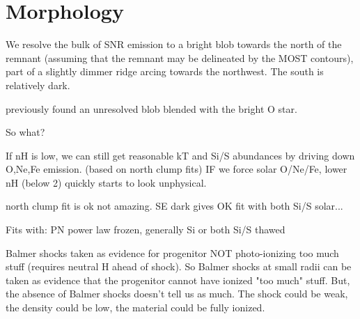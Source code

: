 \documentclass[preprint2,tighten,trackchanges]{aastex6}
\begin{document}
\section{Morphology}

We resolve the bulk of SNR emission to a bright blob towards the north of the
remnant (assuming that the remnant may be delineated by the MOST contours),
part of a slightly dimmer ridge arcing towards the northwest.
The south is relatively dark.

 previously found an unresolved blob blended with the bright O
star.

So what?



If nH is low, we can still get reasonable kT and Si/S abundances
by driving down O,Ne,Fe emission. (based on north clump fits)
IF we force solar O/Ne/Fe, lower nH (below 2) quickly starts to look
unphysical.

north clump fit is ok not amazing.
SE dark gives OK fit with both Si/S solar...

Fits with: PN power law frozen, generally Si or both Si/S thawed



Balmer shocks taken as evidence for progenitor NOT photo-ionizing too much
stuff (requires neutral H ahead of shock).  So Balmer shocks at small radii can
be taken as evidence that the progenitor cannot have ionized "too much" stuff.
But, the absence of Balmer shocks doesn't tell us as much.
The shock could be weak, the density could be low, the material could be fully
ionized.
\end{document}
